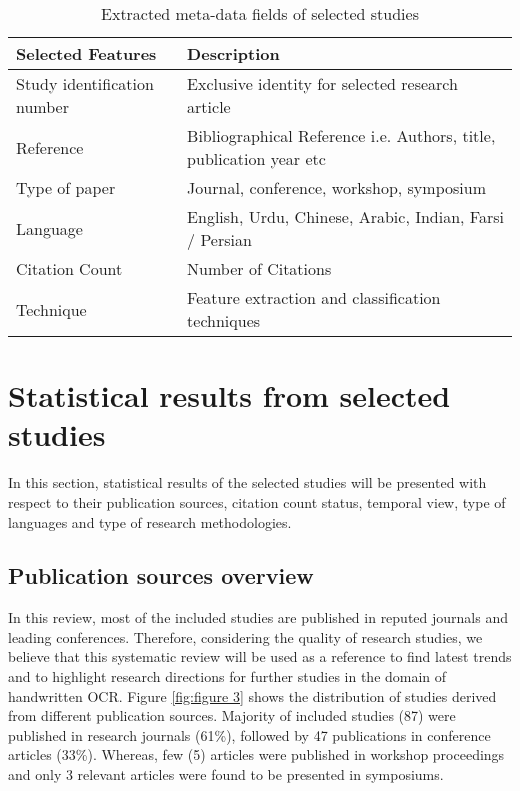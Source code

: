 \documentclass{article}
\begin{document}
\begin{table} [!htb]
\centering
\caption{Extracted meta-data fields of selected studies}
	\begin{tabular}{| l | l |}
		\hline
		\textbf{Selected Features}  & \textbf{Description} \\ \hline
		Study identification number				 	& Exclusive identity for selected research article \\ \hline
		Reference														& Bibliographical Reference i.e. Authors, title, publication year etc \\ \hline
		Type of paper												& Journal, conference, workshop, symposium \\ \hline
		Language														& English, Urdu, Chinese, Arabic, Indian, Farsi / Persian \\ \hline
		Citation Count											& Number of Citations \\ \hline
		Technique 													& Feature extraction and classification techniques \\ \hline
		
	\end{tabular}
\label{Tab:Table 2}
\end{table}




\section{Statistical results from selected studies} \label{SR}
In this section, statistical results of the selected studies will be presented with respect to their publication sources, citation count status, temporal view, type of languages and type of research methodologies. 



\subsection{Publication sources overview}

In this review, most of the included studies are published in reputed journals and leading conferences. Therefore, considering the quality of research studies, we believe that this systematic review will be used as a reference to find latest trends and to highlight research directions for further studies in the domain of handwritten OCR. Figure \ref{fig:figure 3} shows the distribution of studies derived from different publication sources. Majority of included studies (87) were published in research journals (61\%), followed by 47 publications in conference articles (33\%). Whereas, few (5) articles were published in workshop proceedings and only 3 relevant articles were found to be presented in symposiums.
\end{document}
